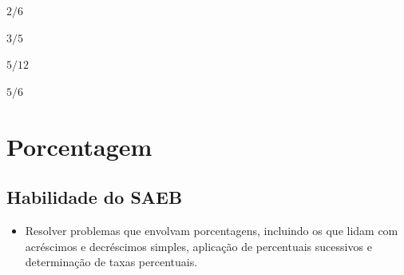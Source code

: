\begin{escolha}
\item$2/6$ 
\item$3/5$ 
\item$5/12$ 
\item$5/6$
\end{escolha}



\chapter{Porcentagem}

\section*{Habilidade do SAEB} 
\begin{itemize}
\item Resolver problemas que envolvam porcentagens,
incluindo os que lidam com acréscimos e decréscimos simples, aplicação
de percentuais sucessivos e determinação de taxas percentuais.
\end{itemize}

